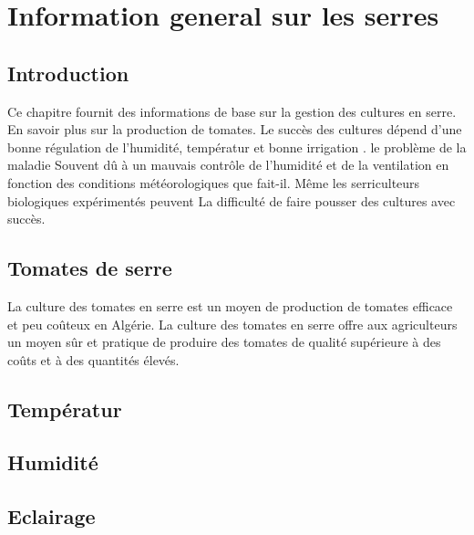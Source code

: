 \chapter{Information general sur les serres } \label{chap:Information general sur les serres}

\section*{Introduction}
Ce chapitre fournit des informations de base sur la gestion des cultures en serre.
En savoir plus sur la production de tomates. 
Le succès des cultures dépend d'une bonne régulation de l'humidité,
 températur et bonne irrigation . le problème de la maladie 
 Souvent dû à un mauvais contrôle de l'humidité et de la ventilation en fonction des conditions météorologiques 
 que fait-il. Même les serriculteurs biologiques expérimentés peuvent 
 La difficulté de faire pousser des cultures avec succès.
 \\
\section*{Tomates de serre }
La culture des tomates en serre est un moyen de production de tomates efficace et peu coûteux en Algérie. La culture des tomates en serre offre aux agriculteurs un moyen sûr et pratique de produire des tomates de qualité supérieure à des coûts et à des quantités élevés.
\section{Températur}
\section{Humidité}
\section{Eclairage}